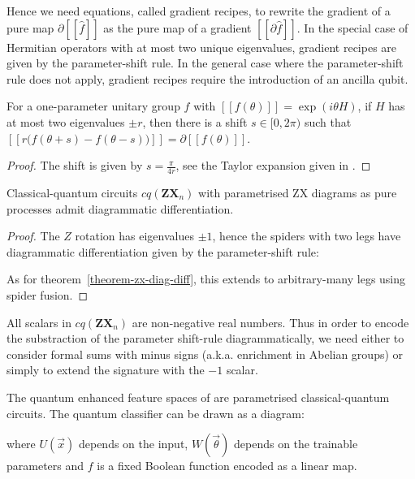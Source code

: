 Hence we need equations, called gradient recipes, to rewrite the gradient of a
pure map $\partial [\![\hat{f}]\!]$ as the pure map of a gradient
$[\![\partial \hat{f}]\!]$.
In the special case of Hermitian operators with at most two unique eigenvalues,
gradient recipes are given by the parameter-shift rule. In the general case
where the parameter-shift rule does not apply, gradient recipes require the
introduction of an ancilla qubit.

\begin{theorem}[Schuld et al.]
For a one-parameter unitary group $f$ with
$[\![f(\theta)]\!] = \exp (i \theta H)$, if $H$ has at most two eigenvalues
$\pm r$, then there is a shift $s \in [0, 2 \pi)$ such that
$[\![r\big(f(\theta + s) - f(\theta - s)\big)]\!] = \partial [\![f(\theta)]\!]$.
\end{theorem}

\begin{proof}
The shift is given by $s = \frac{\pi}{4 r}$, see the Taylor expansion given in
\cite[Theorem 1]{SchuldEtAl19}.
\end{proof}

\begin{corollary}
Classical-quantum circuits $cq(\mathbf{ZX}_n)$ with parametrised ZX diagrams as
pure processes admit diagrammatic differentiation.
\end{corollary}

\begin{proof}
The $Z$ rotation has eigenvalues $\pm 1$, hence the spiders with two legs have
diagrammatic differentiation given by the parameter-shift rule:


As for theorem~\ref{theorem-zx-diag-diff}, this extends to
arbitrary-many legs using spider fusion.
\end{proof}

\begin{remark}
All scalars in $cq(\mathbf{ZX}_n)$ are non-negative real numbers. Thus in order
to encode the substraction of the parameter shift-rule diagrammatically, we
need either to consider formal sums with minus signs (a.k.a. enrichment in
Abelian groups) or simply to extend the signature with the $-1$ scalar.
\end{remark}

\begin{example}
The quantum enhanced feature spaces of \cite{HavlicekEtAl19} are parametrised
classical-quantum circuits.
The quantum classifier can be drawn as a diagram:


where $U(\vec{x})$ depends on the input, $W(\vec{\theta})$ depends on the
trainable parameters and $f$ is a fixed Boolean function encoded as a linear map.
\end{example}
